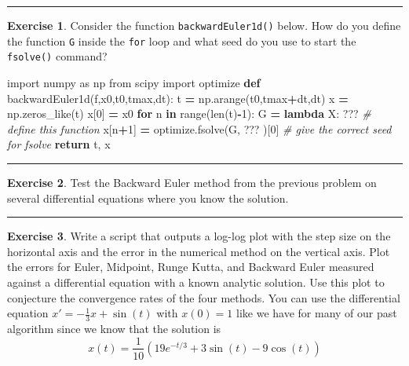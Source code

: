 \documentclass[
]{book}
\newenvironment{Shaded}{\begin{snugshade}}{\end{snugshade}}
\newcommand{\BuiltInTok}[1]{#1}
\newcommand{\CommentTok}[1]{\textcolor[rgb]{0.56,0.35,0.01}{\textit{#1}}}
\newcommand{\ControlFlowTok}[1]{\textcolor[rgb]{0.13,0.29,0.53}{\textbf{#1}}}
\newcommand{\DecValTok}[1]{\textcolor[rgb]{0.00,0.00,0.81}{#1}}
\newcommand{\ImportTok}[1]{#1}
\newcommand{\KeywordTok}[1]{\textcolor[rgb]{0.13,0.29,0.53}{\textbf{#1}}}
\newcommand{\NormalTok}[1]{#1}
\newcommand{\OperatorTok}[1]{\textcolor[rgb]{0.81,0.36,0.00}{\textbf{#1}}}
\theoremstyle{definition}
\theoremstyle{definition}
\theoremstyle{definition}
\newtheorem{exercise}{Exercise}[chapter]
\theoremstyle{remark}
\begin{document}
\begin{center}\rule{0.5\linewidth}{0.5pt}\end{center}

\begin{exercise}
\protect\hypertarget{exr:unnamed-chunk-472}{}{\label{exr:unnamed-chunk-472} }Consider the function \texttt{backwardEuler1d()} below. How do you define the function \texttt{G} inside the \texttt{for} loop and what seed do you use to start the \texttt{fsolve()} command?
\end{exercise}

\begin{Shaded}
\begin{Highlighting}[]
\ImportTok{import}\NormalTok{ numpy }\ImportTok{as}\NormalTok{ np}
\ImportTok{from}\NormalTok{ scipy }\ImportTok{import}\NormalTok{ optimize}
\KeywordTok{def}\NormalTok{ backwardEuler1d(f,x0,t0,tmax,dt):}
\NormalTok{    t }\OperatorTok{=}\NormalTok{ np.arange(t0,tmax}\OperatorTok{+}\NormalTok{dt,dt)}
\NormalTok{    x }\OperatorTok{=}\NormalTok{ np.zeros\_like(t)}
\NormalTok{    x[}\DecValTok{0}\NormalTok{] }\OperatorTok{=}\NormalTok{ x0}
    \ControlFlowTok{for}\NormalTok{ n }\KeywordTok{in} \BuiltInTok{range}\NormalTok{(}\BuiltInTok{len}\NormalTok{(t)}\OperatorTok{{-}}\DecValTok{1}\NormalTok{):}
\NormalTok{        G }\OperatorTok{=} \KeywordTok{lambda}\NormalTok{ X: ??? }\CommentTok{\# define this function}
\NormalTok{        x[n}\OperatorTok{+}\DecValTok{1}\NormalTok{] }\OperatorTok{=}\NormalTok{ optimize.fsolve(G, ??? )[}\DecValTok{0}\NormalTok{] }\CommentTok{\# give the correct seed for fsolve}
    \ControlFlowTok{return}\NormalTok{ t, x}
\end{Highlighting}
\end{Shaded}

\begin{center}\rule{0.5\linewidth}{0.5pt}\end{center}

\begin{exercise}
\protect\hypertarget{exr:unnamed-chunk-474}{}{\label{exr:unnamed-chunk-474} }Test the Backward Euler method from the previous problem on several differential equations where you know the solution.
\end{exercise}

\begin{center}\rule{0.5\linewidth}{0.5pt}\end{center}

\begin{exercise}
\protect\hypertarget{exr:unnamed-chunk-475}{}{\label{exr:unnamed-chunk-475} }Write a script that outputs a log-log plot with the step size on the horizontal axis and the error in the numerical method on the vertical axis. Plot the errors for Euler, Midpoint, Runge Kutta, and Backward Euler measured against a differential equation with a known analytic solution. Use this plot to conjecture the convergence rates of the four methods. You can use the differential equation \(x' = -\frac{1}{3} x + \sin(t)\) with \(x(0) = 1\) like we have for many of our past algorithm since we know that the solution is
\[ x(t) = \frac{1}{10}\left( 19e^{-t/3} + 3\sin(t) - 9\cos(t) \right) \]
\end{exercise}
\end{document}
